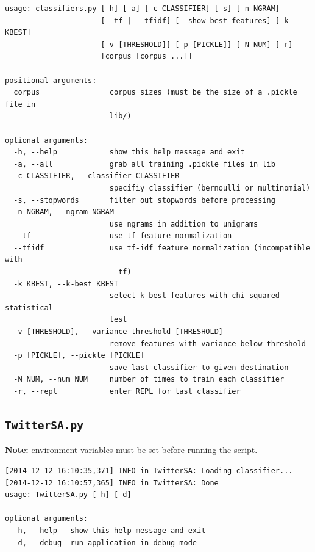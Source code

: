 \documentclass[letter,12pt]{article}
\begin{document}
\begingroup
\fontsize{10pt}{12pt}\selectfont
\begin{verbatim}
usage: classifiers.py [-h] [-a] [-c CLASSIFIER] [-s] [-n NGRAM]
                      [--tf | --tfidf] [--show-best-features] [-k KBEST]
                      [-v [THRESHOLD]] [-p [PICKLE]] [-N NUM] [-r]
                      [corpus [corpus ...]]

positional arguments:
  corpus                corpus sizes (must be the size of a .pickle file in
                        lib/)

optional arguments:
  -h, --help            show this help message and exit
  -a, --all             grab all training .pickle files in lib
  -c CLASSIFIER, --classifier CLASSIFIER
                        specifiy classifier (bernoulli or multinomial)
  -s, --stopwords       filter out stopwords before processing
  -n NGRAM, --ngram NGRAM
                        use ngrams in addition to unigrams
  --tf                  use tf feature normalization
  --tfidf               use tf-idf feature normalization (incompatible with
                        --tf)
  -k KBEST, --k-best KBEST
                        select k best features with chi-squared statistical
                        test
  -v [THRESHOLD], --variance-threshold [THRESHOLD]
                        remove features with variance below threshold
  -p [PICKLE], --pickle [PICKLE]
                        save last classifier to given destination
  -N NUM, --num NUM     number of times to train each classifier
  -r, --repl            enter REPL for last classifier
\end{verbatim}
\endgroup

\subsection{\texttt{TwitterSA.py}}
\label{sub:twittersa}

\textbf{Note:} environment variables must be set before running the script.

\begingroup
\fontsize{10pt}{12pt}\selectfont
\begin{verbatim}
[2014-12-12 16:10:35,371] INFO in TwitterSA: Loading classifier...
[2014-12-12 16:10:57,365] INFO in TwitterSA: Done
usage: TwitterSA.py [-h] [-d]

optional arguments:
  -h, --help   show this help message and exit
  -d, --debug  run application in debug mode
\end{verbatim}
\endgroup


\end{document}
